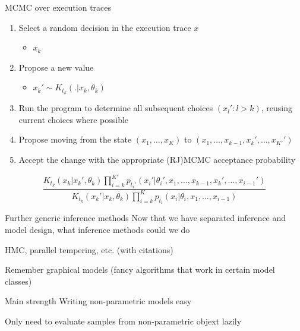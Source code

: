 \begin{frame}{MCMC over execution traces}
  \begin{enumerate}
    \item Select a random decision in the execution trace $x$
    \begin{itemize}
      \item{\eg $x_k$}
    \end{itemize}
    \vspace{\baselineskip}
    \item Propose a new value
    \begin{itemize}
      \item{\eg $x_k' \sim K_{t_k}(.|x_k,\theta_k)$}
    \end{itemize}
    \vspace{\baselineskip}
    \item Run the program to determine all subsequent choices $(x_l' : l > k)$, reusing current choices where possible
    \vspace{\baselineskip}
    \item Propose moving from the state $(x_1,\ldots,x_K)$ to $(x_1,\ldots,x_{k-1},x_k',\ldots,x_{K'}')$
    \vspace{\baselineskip}
    \item Accept the change with the appropriate (RJ)MCMC acceptance probability
  \end{enumerate}
  \begin{equation*}
    \frac{K_{t_k}(x_k|x_k',\theta_k)\prod_{i=k}^{K'} p_{t_i'}(x_i'|\theta_{i}',x_1,\ldots,x_{k-1},x_k',\ldots,x_{i-1}')}{K_{t_k}(x_k'|x_k,\theta_k)\prod_{i=k}^K p_{t_i}(x_i|\theta_{i},x_1,\ldots,x_{i-1})}
  \end{equation*}
\end{frame}


\begin{frame}{Further generic inference methods}
Now that we have separated inference and model design, what inference methods could we do

\eg HMC, parallel tempering, etc. (with citations)

Remember graphical models (fancy algorithms that work in certain model classes)
\end{frame}

\begin{frame}{Main strength}
Writing non-parametric models easy

Only need to evaluate samples from non-parametric objext lazily
\end{frame}

